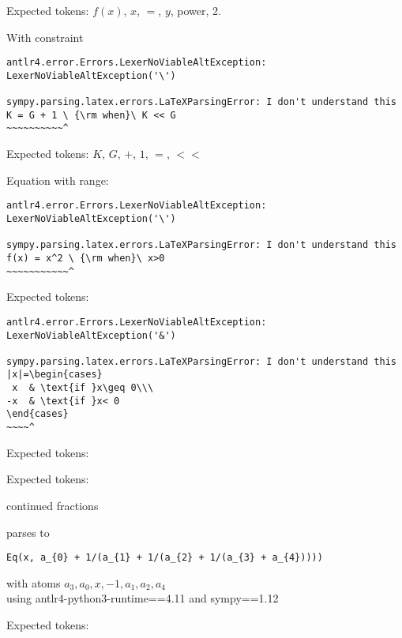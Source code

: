 \documentclass{article}
\begin{document}
Expected tokens: $f(x)$, $x$, $=$, $y$, power, 2.

\hrulefill


With constraint

\begin{verbatim}
antlr4.error.Errors.LexerNoViableAltException: LexerNoViableAltException('\')

sympy.parsing.latex.errors.LaTeXParsingError: I don't understand this
K = G + 1 \ {\rm when}\ K << G
~~~~~~~~~~^
\end{verbatim}

Expected tokens: $K$, $G$, $+$, $1$, $=$, $<<$

\hrulefill


Equation with range:

\begin{verbatim}
antlr4.error.Errors.LexerNoViableAltException: LexerNoViableAltException('\')

sympy.parsing.latex.errors.LaTeXParsingError: I don't understand this
f(x) = x^2 \ {\rm when}\ x>0
~~~~~~~~~~~^
\end{verbatim}

Expected tokens: 

\hrulefill



\begin{verbatim}
antlr4.error.Errors.LexerNoViableAltException: LexerNoViableAltException('&')

sympy.parsing.latex.errors.LaTeXParsingError: I don't understand this
|x|=\begin{cases}
 x  & \text{if }x\geq 0\\\
-x  & \text{if }x< 0
\end{cases}
~~~~^
\end{verbatim}

Expected tokens: 

\hrulefill



Expected tokens: 

\hrulefill

continued fractions
    
parses to
\begin{verbatim}
Eq(x, a_{0} + 1/(a_{1} + 1/(a_{2} + 1/(a_{3} + a_{4}))))
\end{verbatim}
with atoms ${a_{3}, a_{0}, x, -1, a_{1}, a_{2}, a_{4}}$\\
using antlr4-python3-runtime==4.11 and sympy==1.12


Expected tokens: 
\end{document}
